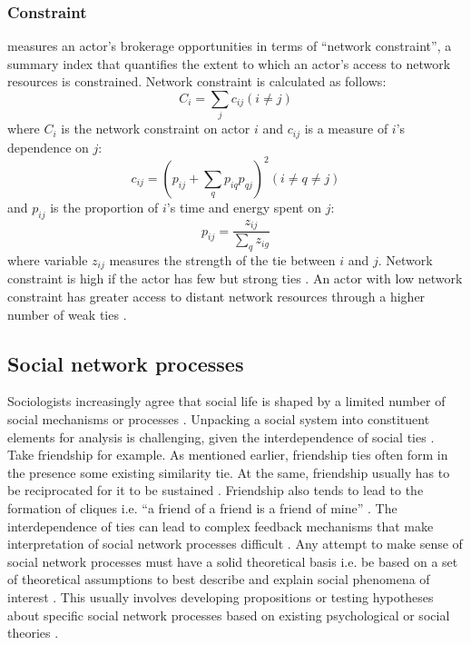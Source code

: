 \subsubsection{Constraint}

\citet{burt1992structural} measures an actor's brokerage opportunities in terms of \enquote{network constraint}, a summary index that quantifies the extent to which an actor's access to network resources is constrained. Network constraint is calculated as follows: $$ C_i = \sum_j c_{ij} (i \neq j) $$ where $C_i$ is the network constraint on actor $i$ and $c_{ij}$ is a measure of $i$'s dependence on $j$: $$ c_{ij} = (p_{ij} + \sum_qp_{iq}p_{qj})^2 (i \neq q \ne j) $$ and $p_{ij}$ is the proportion of $i$'s time and energy spent on $j$: $$ p_{ij} = \frac{z_{ij}}{\sum_qz_{ig}} $$ where variable $z_{ij}$ measures the strength of the tie between $i$ and $j$. Network constraint is high if the actor has few but strong ties \citep{burt2010neighbor}. An actor with low network constraint has greater access to distant network resources through a higher number of weak ties \citep{granovetter1973strength}. \medskip

\subsection{Social network processes}

Sociologists increasingly agree that social life is shaped by a limited number of social mechanisms or processes \citep{crossley2015cases}. Unpacking a social system into constituent elements for analysis is challenging, given the interdependence of social ties \citep{robins2015doing}. Take friendship for example. As mentioned earlier, friendship ties often form in the presence some existing similarity tie. At the same, friendship usually has to be reciprocated for it to be sustained \citep{hartup1996company,almaatouq2016role}. Friendship also tends to lead to the formation of cliques i.e. \enquote{a friend of a friend is a friend of mine} \citep{lusher2013exponential}. The interdependence of ties can lead to complex feedback mechanisms that make interpretation of social network processes difficult \citep{robins2015doing}. Any attempt to make sense of social network processes must have a solid theoretical basis i.e. be based on a set of theoretical assumptions to best describe and explain social phenomena of interest \citep{borgatti2013analyzing}. This usually involves developing propositions or testing hypotheses about specific social network processes based on existing psychological or social theories \citep{scott2017social}. \medskip

